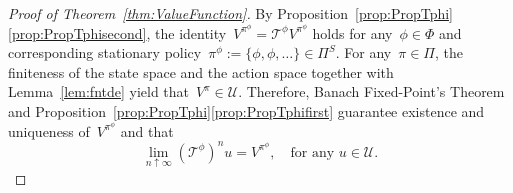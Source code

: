 \documentclass{amsart}[11pt]
\numberwithin{equation}{section}
\theoremstyle{definition}
\newcommand{\Tt}{\mathcal{T}}
\newcommand{\Uu}{\mathcal{U}}
\begin{document}
\begin{proof}[Proof of Theorem~\ref{thm:ValueFunction}]
By Proposition~\ref{prop:PropTphi}\eqref{prop:PropTphisecond}, the identity~$V^{\pi^\phi} = \Tt^\phi V^{\pi^\phi}$ holds for any~$\phi\in\Phi$ and corresponding stationary policy~$\pi^\phi := \{\phi, \phi, \dots\}\in \Pi^S$.
For any~$\pi\in\Pi$, the finiteness of the state space and the action space together with Lemma~\ref{lem:fntde} yield that~$V^\pi\in\Uu$.
Therefore, Banach Fixed-Point's Theorem~\cite{granas2013fixed}
and Proposition~\ref{prop:PropTphi}\eqref{prop:PropTphifirst}
guarantee existence and uniqueness of~$V^{\pi^\phi}$ and that
\begin{equation}\label{eq:pfeq1}
\lim_{n\uparrow\infty}\left(\Tt^\phi\right)^n u = V^{\pi^\phi},\quad\text{for any }u\in\Uu.
\end{equation}


\end{proof}
\end{document}
